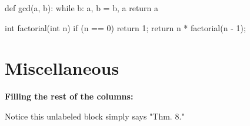 \begin{codeexample}[language=Python]
def gcd(a, b):
    while b:
        a, b = b, a %
    return a
\end{codeexample}

\begin{algorithm}[language=C]
int factorial(int n) {
    if (n == 0) return 1;
    return n * factorial(n - 1);
}
\end{algorithm}

\section{Miscellaneous}

\textbf{Filling the rest of the columns:} \\
\lipsum[1]

\begin{theorem}
    Notice this unlabeled block simply says "Thm. 8." 
\end{theorem}

\lipsum[2]
